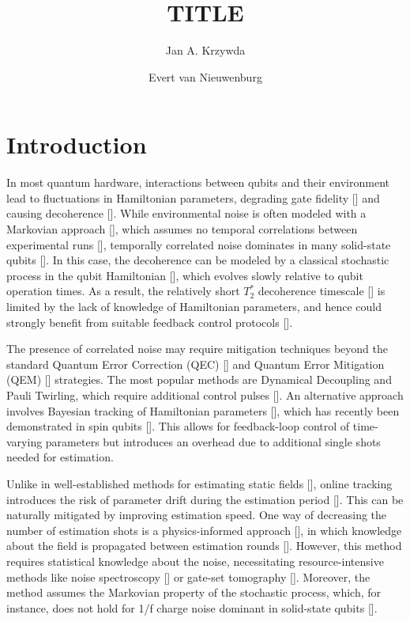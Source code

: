 \documentclass[aps,twocolumn,pra,notitlepage,]{revtex4-2}
\begin{document}
\author{Jan A. Krzywda}
\author{Evert van Nieuwenburg}

\title{TITLE} 


\begin{abstract}

\end{abstract}
\maketitle

\section{Introduction}
In most quantum hardware, interactions between qubits and their environment lead to fluctuations in Hamiltonian parameters, degrading gate fidelity [] and causing decoherence []. While environmental noise is often modeled with a Markovian approach [], which assumes no temporal correlations between experimental runs [], temporally correlated noise dominates in many solid-state qubits []. In this case, the decoherence can be modeled by a classical stochastic process in the qubit Hamiltonian [], which evolves slowly relative to qubit operation times. As a result, the relatively short \( T_2^* \) decoherence timescale [] is limited by the lack of knowledge of Hamiltonian parameters, and hence could strongly benefit from suitable feedback control protocols [].

The presence of correlated noise may require mitigation techniques beyond the standard Quantum Error Correction (QEC) [] and Quantum Error Mitigation (QEM) [] strategies. The most popular methods are Dynamical Decoupling and Pauli Twirling, which require additional control pulses []. An alternative approach involves Bayesian tracking of Hamiltonian parameters [], which has recently been demonstrated in spin qubits []. This allows for feedback-loop control of time-varying parameters but introduces an overhead due to additional single shots needed for estimation.

Unlike in well-established methods for estimating static fields [], online tracking introduces the risk of parameter drift during the estimation period []. This can be naturally mitigated by improving estimation speed. One way of decreasing the number of estimation shots is a physics-informed approach [], in which knowledge about the field is propagated between estimation rounds []. However, this method requires statistical knowledge about the noise, necessitating resource-intensive methods like noise spectroscopy [] or gate-set tomography []. Moreover, the method assumes the Markovian property of the stochastic process, which, for instance, does not hold for 1/f charge noise dominant in solid-state qubits [].
\end{document}
